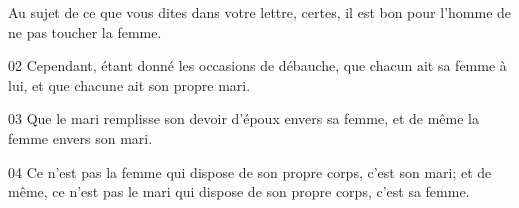 Au sujet de ce que vous dites dans votre lettre, certes, il est bon pour l’homme de ne pas toucher la femme.

02 Cependant, étant donné les occasions de débauche, que chacun ait sa femme à lui, et que chacune ait son propre mari.

03 Que le mari remplisse son devoir d’époux envers sa femme, et de même la femme envers son mari.

04 Ce n’est pas la femme qui dispose de son propre corps, c’est son mari; et de même, ce n’est pas le mari qui dispose de son propre corps, c’est sa femme.
